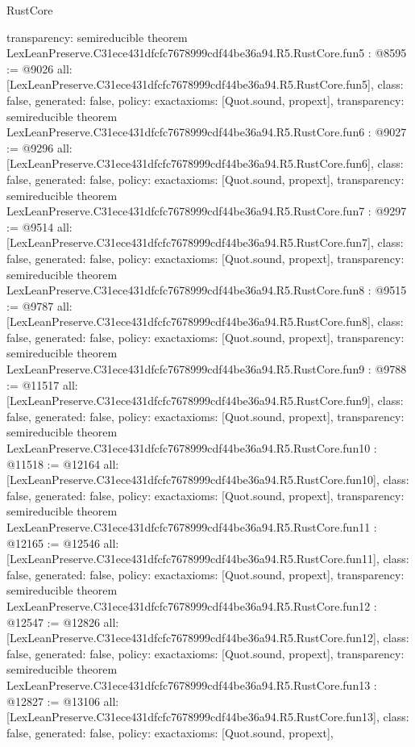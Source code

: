 \begin{lexlean}{RustCore}
\begin{coremodule}
{  transparency: semireducible
}
theorem LexLeanPreserve.C31ece431dfcfc7678999cdf44be36a94.R5.RustCore.fun5 : @8595 := @9026 {
  all: [LexLeanPreserve.C31ece431dfcfc7678999cdf44be36a94.R5.RustCore.fun5],
  class: false,
  generated: false,
  policy: exact{axioms: [Quot.sound, propext]},
  transparency: semireducible
}
theorem LexLeanPreserve.C31ece431dfcfc7678999cdf44be36a94.R5.RustCore.fun6 : @9027 := @9296 {
  all: [LexLeanPreserve.C31ece431dfcfc7678999cdf44be36a94.R5.RustCore.fun6],
  class: false,
  generated: false,
  policy: exact{axioms: [Quot.sound, propext]},
  transparency: semireducible
}
theorem LexLeanPreserve.C31ece431dfcfc7678999cdf44be36a94.R5.RustCore.fun7 : @9297 := @9514 {
  all: [LexLeanPreserve.C31ece431dfcfc7678999cdf44be36a94.R5.RustCore.fun7],
  class: false,
  generated: false,
  policy: exact{axioms: [Quot.sound, propext]},
  transparency: semireducible
}
theorem LexLeanPreserve.C31ece431dfcfc7678999cdf44be36a94.R5.RustCore.fun8 : @9515 := @9787 {
  all: [LexLeanPreserve.C31ece431dfcfc7678999cdf44be36a94.R5.RustCore.fun8],
  class: false,
  generated: false,
  policy: exact{axioms: [Quot.sound, propext]},
  transparency: semireducible
}
theorem LexLeanPreserve.C31ece431dfcfc7678999cdf44be36a94.R5.RustCore.fun9 : @9788 := @11517 {
  all: [LexLeanPreserve.C31ece431dfcfc7678999cdf44be36a94.R5.RustCore.fun9],
  class: false,
  generated: false,
  policy: exact{axioms: [Quot.sound, propext]},
  transparency: semireducible
}
theorem LexLeanPreserve.C31ece431dfcfc7678999cdf44be36a94.R5.RustCore.fun10 : @11518 := @12164 {
  all: [LexLeanPreserve.C31ece431dfcfc7678999cdf44be36a94.R5.RustCore.fun10],
  class: false,
  generated: false,
  policy: exact{axioms: [Quot.sound, propext]},
  transparency: semireducible
}
theorem LexLeanPreserve.C31ece431dfcfc7678999cdf44be36a94.R5.RustCore.fun11 : @12165 := @12546 {
  all: [LexLeanPreserve.C31ece431dfcfc7678999cdf44be36a94.R5.RustCore.fun11],
  class: false,
  generated: false,
  policy: exact{axioms: [Quot.sound, propext]},
  transparency: semireducible
}
theorem LexLeanPreserve.C31ece431dfcfc7678999cdf44be36a94.R5.RustCore.fun12 : @12547 := @12826 {
  all: [LexLeanPreserve.C31ece431dfcfc7678999cdf44be36a94.R5.RustCore.fun12],
  class: false,
  generated: false,
  policy: exact{axioms: [Quot.sound, propext]},
  transparency: semireducible
}
theorem LexLeanPreserve.C31ece431dfcfc7678999cdf44be36a94.R5.RustCore.fun13 : @12827 := @13106 {
  all: [LexLeanPreserve.C31ece431dfcfc7678999cdf44be36a94.R5.RustCore.fun13],
  class: false,
  generated: false,
  policy: exact{axioms: [Quot.sound, propext]},
}
\end{coremodule}
\end{lexlean}
